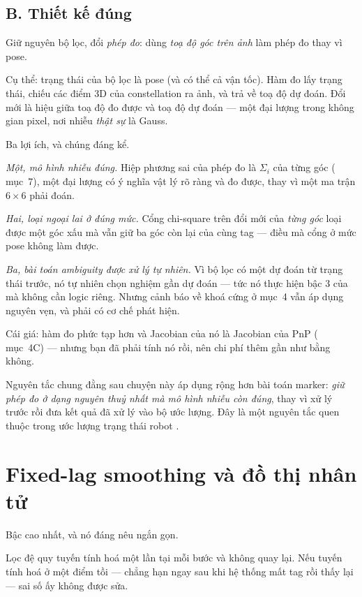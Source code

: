 \documentclass[../../marker.tex]{subfiles}
\begin{document}
\subsection{B. Thiết kế đúng}

Giữ nguyên bộ lọc, đổi \emph{phép đo}: dùng \emph{toạ độ góc trên ảnh} làm phép đo thay vì pose.

Cụ thể: trạng thái của bộ lọc là pose (và có thể cả vận tốc). Hàm đo lấy trạng thái, chiếu các điểm 3D của constellation ra ảnh, và trả về toạ độ dự đoán. Đổi mới là hiệu giữa toạ độ đo được và toạ độ dự đoán --- một đại lượng trong không gian pixel, nơi nhiễu \emph{thật sự} là Gauss.

Ba lợi ích, và chúng đáng kể.

\emph{Một, mô hình nhiễu đúng.} Hiệp phương sai của phép đo là \(\Sigma_i\) của từng góc ( mục~7), một đại lượng có ý nghĩa vật lý rõ ràng và đo được, thay vì một ma trận \(6\times6\) phải đoán.

\emph{Hai, loại ngoại lai ở đúng mức.} Cổng chi-square trên đổi mới của \emph{từng góc} loại được một góc xấu mà vẫn giữ ba góc còn lại của cùng tag --- điều mà cổng ở mức pose không làm được.

\emph{Ba, bài toán ambiguity được xử lý tự nhiên.} Vì bộ lọc có một dự đoán từ trạng thái trước, nó tự nhiên chọn nghiệm gần dự đoán --- tức nó thực hiện bậc 3 của  mà không cần logic riêng. Nhưng cảnh báo về khoá cứng ở  mục~4 vẫn áp dụng nguyên vẹn, và phải có cơ chế phát hiện.

Cái giá: hàm đo phức tạp hơn và Jacobian của nó là Jacobian của PnP ( mục~4C) --- nhưng bạn đã phải tính nó rồi, nên chi phí thêm gần như bằng không.

Nguyên tắc chung đằng sau chuyện này áp dụng rộng hơn bài toán marker: \emph{giữ phép đo ở dạng nguyên thuỷ nhất mà mô hình nhiễu còn đúng}, thay vì xử lý trước rồi đưa kết quả đã xử lý vào bộ ước lượng. Đây là một nguyên tắc quen thuộc trong ước lượng trạng thái robot \cite{barfoot2017}.

\section{Fixed-lag smoothing và đồ thị nhân tử}

Bậc cao nhất, và nó đáng nêu ngắn gọn.

Lọc đệ quy tuyến tính hoá một lần tại mỗi bước và không quay lại. Nếu tuyến tính hoá ở một điểm tồi --- chẳng hạn ngay sau khi hệ thống mất tag rồi thấy lại --- sai số ấy không được sửa.
\end{document}
